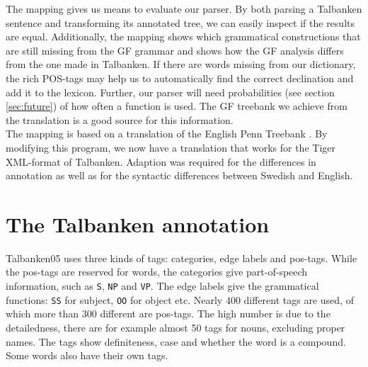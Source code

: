 \documentclass{report}
\begin{document}
The mapping %
gives us means to evaluate our parser. By both parsing a Talbanken sentence and
transforming its annotated tree, we can easily inspect if the results are
equal.
Additionally, the mapping shows which grammatical constructions that are still missing
from the GF grammar and shows how the GF analysis differs from the one made
in Talbanken.
If there are words missing from our dictionary, the rich
POS-tags may help us to automatically find the correct declination and add it to the
lexicon. Further, our parser will need probabilities (see section
\ref{sec:future}) of how often a function is used. The GF treebank we
achieve from the translation is a good source for this information.\\

The mapping is based on 
a translation of the English Penn Treebank \cite{gfpenn}.
By modifying this program, we now have a translation that works for
the Tiger XML-format of
Talbanken. Adaption was required for the differences in annotation as well as 
for the syntactic differences between Swedish and English.

\section{The Talbanken annotation}
Talbanken05 uses three kinds of tags: categories, edge labels and pos-tags. 
While the pos-tags are reserved for words, the categories give part-of-speech information,
such as \verb|S|, \verb|NP| and \verb|VP|.
The edge labels give the grammatical functions: \verb|SS| for subject, 
\verb|OO| for object etc. Nearly 400 different tags are used, of which more than
300 different are pos-tags. The high number is due to the detailedness,  there are for
example almost 50 tags for nouns, excluding proper names. The tags
show definiteness, case and whether the word is a compound. Some words also have
their own tags.\\
\end{document}
